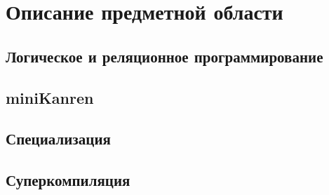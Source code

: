 \section{Описание предметной области}

\subsection{Логическое и реляционное программирование}






\subsection{miniKanren}



\subsection{Специализация}



\subsection{Суперкомпиляция}



